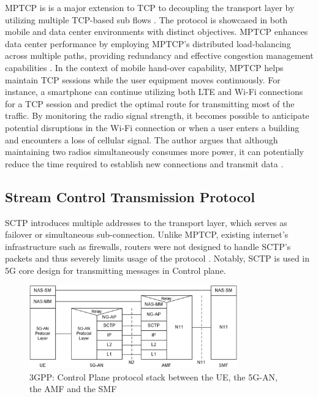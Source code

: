 \ac{MPTCP} is is a major extension to TCP to decoupling the transport layer by utilizing multiple TCP-based sub flows \cite{Bonaventure_mptcp_decoupling}.
The protocol is showcased in both mobile and data center environments with distinct objectives. 
\ac{MPTCP} enhances data center performance by employing \ac{MPTCP}'s distributed load-balancing across multiple paths, providing redundancy and effective congestion management capabilities \cite{raiciu_improving_nodate}.
In the context of mobile hand-over capability, \ac{MPTCP} helps maintain TCP sessions while the user equipment moves continuously. 
For instance, a smartphone can continue utilizing both LTE and Wi-Fi connections for a TCP session and predict the optimal route for transmitting most of the traffic. 
By monitoring the radio signal strength, it becomes possible to anticipate potential disruptions in the Wi-Fi connection or when a user enters a building and encounters a loss of cellular signal. 
The author argues that although maintaining two radios simultaneously consumes more power, it can potentially reduce the time required to establish new connections and transmit data \cite{paasch_multipath_2014}.


\subsection{Stream Control Transmission Protocol}\label{sec:related_work:mp_connection:SCTP}
\ac{SCTP} introduces multiple addresses to the transport layer, which serves as failover or simultaneous sub-connection.
Unlike \ac{MPTCP}, existing internet's infrastructure such as firewalls, routers were not designed to handle \ac{SCTP}'s packets and thus severely limits usage of the protocol \cite{paasch_multipath_2014}. 
Notably, \ac{SCTP} is used in 5G core design for transmitting messages in Control plane.

\begin{figure}[H]
	\centering
	\includegraphics[width=0.8\textwidth]{resources/images/3gpp_5g_part_of_control_plane_protocol.png}
	\caption{3GPP: Control Plane protocol stack between the UE, the 5G-AN, the AMF and the SMF \cite{3gpp_5g_system_overview}}
    \label{fig:related_work:3gpp_5g_part_of_control_plane_protocol}
\end{figure}


